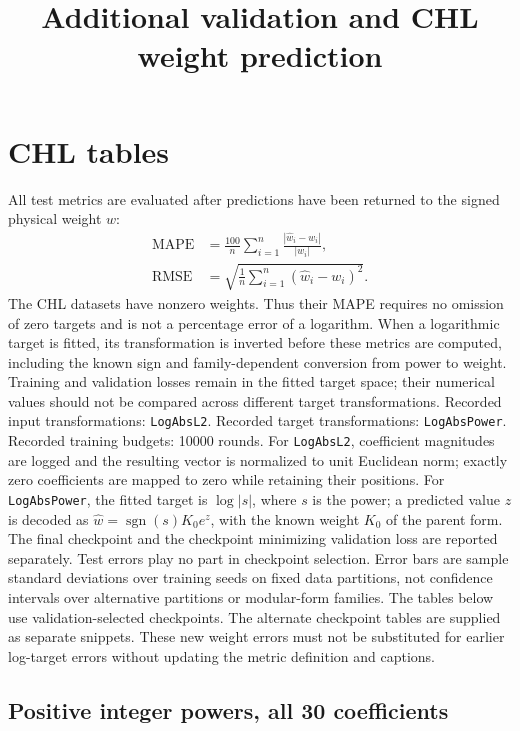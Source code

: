 \documentclass[10pt]{article}
\title{Additional validation and CHL weight prediction}
\author{}
\date{}
\begin{document}
\maketitle

\clearpage
\section{CHL tables}
All test metrics are evaluated after predictions have been returned to the signed physical weight $w$:
\begin{align}
 \mathrm{MAPE} &= \frac{100}{n}\sum_{i=1}^n
              \frac{|\widehat w_i-w_i|}{|w_i|},\\
 \mathrm{RMSE} &= \sqrt{\frac1n\sum_{i=1}^n(\widehat w_i-w_i)^2}.
\end{align}
The CHL datasets have nonzero weights. Thus their MAPE requires no omission of
zero targets and is not a percentage error of a logarithm. When a logarithmic
target is fitted, its transformation is inverted before these metrics are
computed, including the known sign and family-dependent conversion from power
to weight. Training and validation losses remain in the fitted target space;
their numerical values should not be compared across different target transformations.
Recorded input transformations: \texttt{LogAbsL2}. Recorded target transformations:
\texttt{LogAbsPower}. Recorded training budgets: 10000 rounds.
For \texttt{LogAbsL2}, coefficient magnitudes are logged and the resulting vector is normalized to unit Euclidean norm; exactly zero coefficients are mapped to zero while retaining their positions.
For \texttt{LogAbsPower}, the fitted target is $\log|s|$, where $s$ is the power; a predicted value $z$ is decoded as $\widehat w=\operatorname{sgn}(s)K_0 e^z$, with the known weight $K_0$ of the parent form.
The final checkpoint and the checkpoint minimizing validation loss are reported
separately. Test errors play no part in checkpoint selection. Error bars are sample
standard deviations over training seeds on fixed data partitions, not confidence
intervals over alternative partitions or modular-form families.
The tables below use validation-selected checkpoints. The alternate checkpoint tables are supplied as separate snippets. These new weight errors must not be substituted for earlier log-target errors without updating the metric definition and captions.
\clearpage
\subsection{Positive integer powers, all 30 coefficients}

\end{document}
